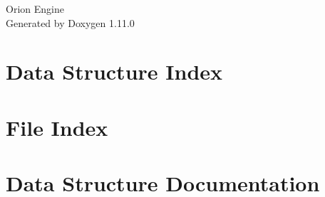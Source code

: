 \documentclass[twoside]{book}
\newcommand{\+}{\discretionary{\mbox{\scriptsize$\hookleftarrow$}}{}{}}
\newcommand{\clearemptydoublepage}{%
    \newpage{\pagestyle{empty}\cleardoublepage}%
  }
\begin{document}
  \raggedbottom
    \hypersetup{pageanchor=false,
                bookmarksnumbered=true,
                pdfencoding=unicode
               }
  \begin{titlepage}
  \vspace*{7cm}
  \begin{center}%
  {\Large Orion Engine}\\
  \vspace*{1cm}
  {\large Generated by Doxygen 1.11.0}\\
  \end{center}
  \end{titlepage}
  \clearemptydoublepage
  \tableofcontents
  \clearemptydoublepage
  \hypersetup{pageanchor=true}

\chapter{Data Structure Index}

\chapter{File Index}

\chapter{Data Structure Documentation}















































\end{document}
